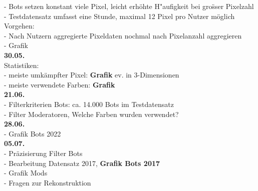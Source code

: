 - Bots setzen konstant viele Pixel, leicht erh{\"o}hte H{{"a}ufigkeit bei gro{\"ss}er Pixelzahl\\
- Testdatensatz umfasst eine Stunde, maximal 12 Pixel pro Nutzer m{\"o}glich\\
Vorgehen:\\
- Nach Nutzern aggregierte Pixeldaten nochmal nach Pixelanzahl aggregieren\\
- Grafik \\
\textbf{30.05.}\\
Statistiken:\\
- meiste umk{\"a}mpfter Pixel: \textbf{Grafik} ev. in 3-Dimensionen\\
- meiste verwendete Farben: \textbf{Grafik}\\
\textbf{21.06.}\\
- Filterkriterien Bots: ca. 14.000 Bots im Testdatensatz\\
- Filter Moderatoren,  Welche Farben wurden verwendet?\\
\textbf{28.06.}\\
- Grafik Bots 2022\\
\textbf{05.07.}\\
- Pr{\"a}zisierung Filter Bots\\
- Bearbeitung Datensatz 2017, \textbf{Grafik Bots 2017}\\
- Grafik Mods\\
- Fragen zur Rekonstruktion\\

}
